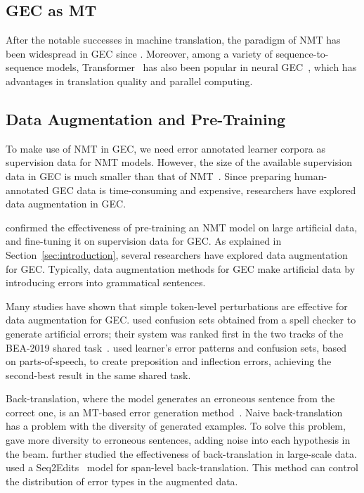 \documentclass[11pt]{article}
\begin{document}
\subsection{GEC as MT}

After the notable successes in machine translation, the paradigm of NMT has been widespread in GEC since \citet{yuan-briscoe-2016-grammatical}.
Moreover, among a variety of sequence-to-sequence models, Transformer~\citep{NIPS2017_3f5ee243} has also been popular in neural GEC~\citep{junczys-dowmunt-etal-2018-approaching},
which has advantages in translation quality and parallel computing.

\subsection{Data Augmentation and Pre-Training}

To make use of NMT in GEC, we need error annotated learner corpora as supervision data for NMT models.
However, the size of the available supervision data in GEC is much smaller than that of NMT~\citep{junczys-dowmunt-etal-2018-approaching}.
Since preparing human-annotated GEC data is time-consuming and expensive, researchers have explored data augmentation in GEC.

\citet{lichtarge-etal-2019-corpora} confirmed the effectiveness of pre-training an NMT model on large artificial data, and fine-tuning it on supervision data for GEC.
As explained in Section~\ref{sec:introduction}, several researchers have explored data augmentation for GEC.
Typically, data augmentation methods for GEC make artificial data by introducing errors into grammatical sentences.

Many studies have shown that simple token-level perturbations are effective for data augmentation for GEC.
\citet{grundkiewicz-etal-2019-neural} used confusion sets obtained from a spell checker to generate artificial errors;
their system was ranked first in the two tracks of the BEA-2019 shared task~\citep{bryant-etal-2019-bea}.
\citet{choe-etal-2019-neural} used learner's error patterns and confusion sets, based on parts-of-speech,
to create preposition and inflection errors, achieving the second-best result in the same shared task.

Back-translation, where the model generates an erroneous sentence from the correct one, is an MT-based error generation method~\citep{rei-etal-2017-artificial}.
Naive back-translation has a problem with the diversity of generated examples.
To solve this problem, \citet{xie-etal-2018-noising} gave more diversity to erroneous sentences, adding noise into each hypothesis in the beam.
\citet{kiyono-etal-2019-empirical} further studied the effectiveness of back-translation in large-scale data.
\citet{stahlberg-kumar-2021-synthetic} used a Seq2Edits~\citep{stahlberg-kumar-2020-seq2edits} model for span-level back-translation.
This method can control the distribution of error types in the augmented data.
\end{document}
